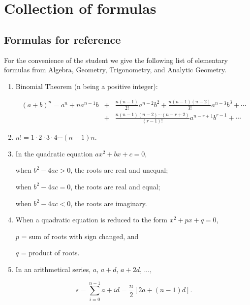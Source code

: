  

\chapter{Collection of formulas}
\label{ch:1}

\section{Formulas for reference}
\label{sec:1}

For the convenience of the student we give 
the following list of elementary formulas from Algebra, Geometry, 
Trigonometry, and Analytic Geometry.

\begin{enumerate}
\item
Binomial Theorem (n being a positive integer):

\[
\begin{matrix} 
(a + b)^n = a^n + na^{n-1}b &+& \frac{n(n - 1)}{2!}a^{n-2}b^2 
+ \frac{n(n - 1)(n - 2)}{3!}a^{n-3}b^3 + \cdots \\ 
&+& \frac{n(n - 1)(n - 2)\cdots(n - r + 2)}{(r - 1)!}a^{n-r+1}b^{r-1} + \cdots 
\end{matrix}
\]

\item
$n! = 1 \cdot 2 \cdot 3 \cdot 4 \cdots (n - 1)n$.

\item
In the quadratic equation $ax^2 + bx + c = 0$,

\qquad      when $b^2-4ac > 0$, the roots are real and unequal;

\qquad      when $b^2-4ac = 0$, the roots are real and equal;

\qquad      when $b^2-4ac < 0$, the roots are imaginary.

\item
When a quadratic equation is reduced to the form $x^2 + px + q = 0$,

\qquad     $p$ = sum of roots with sign changed, and 

\qquad  $q$ = product of roots.

\item
In an arithmetical series, $a$, $a+d$, $a+2d$, ..., 

\[
s = \sum_{i=0}^{n-1} a + id = \frac{n}{2}[2a + (n-1)d].
\]


\end{enumerate}
